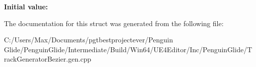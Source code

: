 {\bfseries Initial value\+:}
\begin{DoxyCode}{0}
\DoxyCodeLine{= \{}
\DoxyCodeLine{    \}}

\end{DoxyCode}


The documentation for this struct was generated from the following file\+:\begin{DoxyCompactItemize}
\item 
C\+:/\+Users/\+Max/\+Documents/pgtbestprojectever/\+Penguin Glide/\+Penguin\+Glide/\+Intermediate/\+Build/\+Win64/\+U\+E4\+Editor/\+Inc/\+Penguin\+Glide/Track\+Generator\+Bezier.\+gen.\+cpp\end{DoxyCompactItemize}
